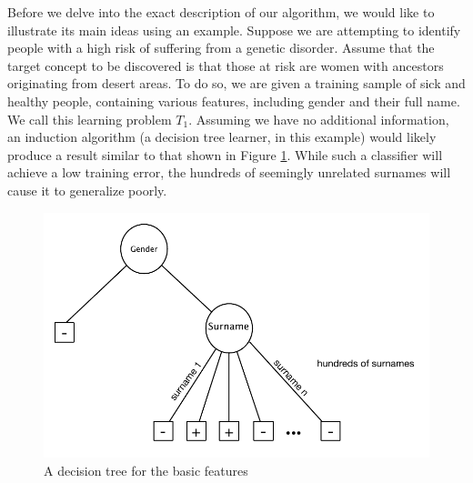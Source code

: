 \documentclass[twoside,11pt]{article}
\theoremstyle{definition}
\begin{document}
Before we delve into the exact description of our algorithm, we would like to illustrate its main ideas using an example.
Suppose we are attempting to identify people with a high risk of suffering from a genetic disorder. Assume that the target concept to be discovered is that those at risk are women with ancestors originating from desert areas. To do so, we are given a training sample of sick and healthy people, containing various features, including gender and their full name. We call this learning problem $T_1$.
Assuming we have no additional information, an induction algorithm (a decision tree learner, in this example) would likely produce a result similar to that shown in Figure \ref{fig:tree_base}. While such a classifier will achieve a low training error, the hundreds of seemingly unrelated surnames will cause it to generalize poorly. %

\begin{figure}[h]
	\centering
	\includegraphics[width=0.8\linewidth]{fig1.pdf}
	\caption{A decision tree for the basic features}
	\label{fig:tree_base}
\end{figure}
\end{document}
